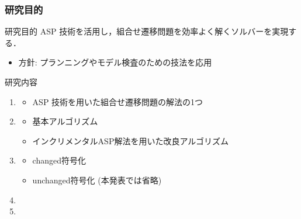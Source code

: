 \documentclass[dvipdfmx,11pt]{beamer}
\begin{document}
\begin{frame}
  \frametitle{研究目的}
  \begin{alertblock}{研究目的}
    ASP 技術を活用し，組合せ遷移問題を効率よく解くソルバーを実現する．
  \end{alertblock}
  \begin{itemize}
  \item 方針: プランニングやモデル検査のための技法を応用
  \end{itemize}
  \begin{block}{研究内容}
    \begin{enumerate}
    \item {}
      \begin{itemize}
      \item ASP 技術を用いた組合せ遷移問題の解法の1つ
      \end{itemize}
    \item {}
      \begin{itemize}
      \item 基本アルゴリズム
      \item インクリメンタルASP解法を用いた改良アルゴリズム
      \end{itemize}
    \item {}
      \begin{itemize}
      \item \textsf{changed}符号化
      \item \textsf{unchanged}符号化 (本発表では省略)
      \end{itemize}
    \item {}
    \item {}
    \end{enumerate}
  \end{block}
\end{frame}
\end{document}
